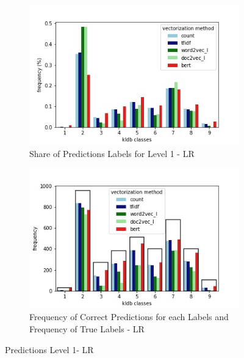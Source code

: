 \documentclass[12pt, a4paper, titlepage]{article}
\begin{document}
\begin{figure}[hb!]
  \centering
  \begin{subfigure}[b]{0.475\textwidth}
      \centering
      \includegraphics[width=\textwidth]{predictions_LR.jpg}
      { \bigskip
        {\small Share of Predictions Labels for Level 1 - LR}
      }    
  \end{subfigure}
  \hfill
  \begin{subfigure}[b]{0.475\textwidth}  
      \centering 
      \includegraphics[width=\textwidth]{predictions_correct_relative_LR.jpg}
      {{\small Frequency of Correct Predictions for each Labels and Frequency of True Labels - LR}}    
  \end{subfigure}
\caption{\label{fig: F13} Predictions Level 1- LR}
\end{figure}
\end{document}

